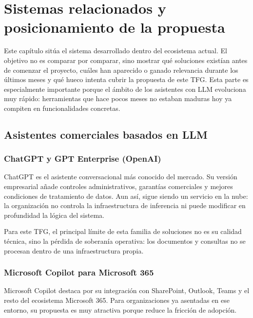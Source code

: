 \chapter{Sistemas relacionados y posicionamiento de la propuesta}
\label{cap:sistemas}

Este capítulo sitúa el sistema desarrollado dentro del ecosistema actual. El objetivo no es comparar por comparar, sino mostrar qué soluciones existían antes de comenzar el proyecto, cuáles han aparecido o ganado relevancia durante los últimos meses y qué hueco intenta cubrir la propuesta de este TFG. Esta parte es especialmente importante porque el ámbito de los asistentes con LLM evoluciona muy rápido: herramientas que hace pocos meses no estaban maduras hoy ya compiten en funcionalidades concretas.

\section{Asistentes comerciales basados en LLM}

\subsection{ChatGPT y GPT Enterprise (OpenAI)}

ChatGPT es el asistente conversacional más conocido del mercado. Su versión empresarial añade controles administrativos, garantías comerciales y mejores condiciones de tratamiento de datos. Aun así, sigue siendo un servicio en la nube: la organización no controla la infraestructura de inferencia ni puede modificar en profundidad la lógica del sistema.

Para este TFG, el principal límite de esta familia de soluciones no es su calidad técnica, sino la pérdida de soberanía operativa: los documentos y consultas no se procesan dentro de una infraestructura propia.

\subsection{Microsoft Copilot para Microsoft 365}

Microsoft Copilot destaca por su integración con SharePoint, Outlook, Teams y el resto del ecosistema Microsoft 365. Para organizaciones ya asentadas en ese entorno, su propuesta es muy atractiva porque reduce la fricción de adopción.

